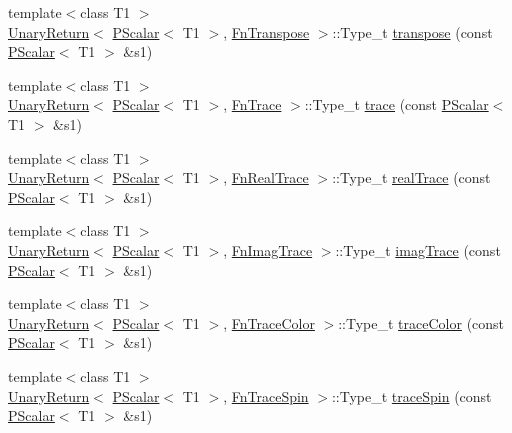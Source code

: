 \begin{DoxyCompactItemize}
\item 
{\footnotesize template$<$class T1 $>$ }\\\mbox{\hyperlink{structENSEM_1_1UnaryReturn}{Unary\+Return}}$<$ \mbox{\hyperlink{classENSEM_1_1PScalar}{P\+Scalar}}$<$ T1 $>$, \mbox{\hyperlink{structENSEM_1_1FnTranspose}{Fn\+Transpose}} $>$\+::Type\+\_\+t \mbox{\hyperlink{group__primscalar_gafa9e84efffc0a6f10d97120033276f1c}{transpose}} (const \mbox{\hyperlink{classENSEM_1_1PScalar}{P\+Scalar}}$<$ T1 $>$ \&s1)
\item 
{\footnotesize template$<$class T1 $>$ }\\\mbox{\hyperlink{structENSEM_1_1UnaryReturn}{Unary\+Return}}$<$ \mbox{\hyperlink{classENSEM_1_1PScalar}{P\+Scalar}}$<$ T1 $>$, \mbox{\hyperlink{structENSEM_1_1FnTrace}{Fn\+Trace}} $>$\+::Type\+\_\+t \mbox{\hyperlink{group__primscalar_ga13a07d573bfefc0db7496d278c078a52}{trace}} (const \mbox{\hyperlink{classENSEM_1_1PScalar}{P\+Scalar}}$<$ T1 $>$ \&s1)
\item 
{\footnotesize template$<$class T1 $>$ }\\\mbox{\hyperlink{structENSEM_1_1UnaryReturn}{Unary\+Return}}$<$ \mbox{\hyperlink{classENSEM_1_1PScalar}{P\+Scalar}}$<$ T1 $>$, \mbox{\hyperlink{structENSEM_1_1FnRealTrace}{Fn\+Real\+Trace}} $>$\+::Type\+\_\+t \mbox{\hyperlink{group__primscalar_ga63efc63157b5fc9495798f0391c8e170}{real\+Trace}} (const \mbox{\hyperlink{classENSEM_1_1PScalar}{P\+Scalar}}$<$ T1 $>$ \&s1)
\item 
{\footnotesize template$<$class T1 $>$ }\\\mbox{\hyperlink{structENSEM_1_1UnaryReturn}{Unary\+Return}}$<$ \mbox{\hyperlink{classENSEM_1_1PScalar}{P\+Scalar}}$<$ T1 $>$, \mbox{\hyperlink{structENSEM_1_1FnImagTrace}{Fn\+Imag\+Trace}} $>$\+::Type\+\_\+t \mbox{\hyperlink{group__primscalar_gaf760659a12c2bd7668440d8b83333086}{imag\+Trace}} (const \mbox{\hyperlink{classENSEM_1_1PScalar}{P\+Scalar}}$<$ T1 $>$ \&s1)
\item 
{\footnotesize template$<$class T1 $>$ }\\\mbox{\hyperlink{structENSEM_1_1UnaryReturn}{Unary\+Return}}$<$ \mbox{\hyperlink{classENSEM_1_1PScalar}{P\+Scalar}}$<$ T1 $>$, \mbox{\hyperlink{structENSEM_1_1FnTraceColor}{Fn\+Trace\+Color}} $>$\+::Type\+\_\+t \mbox{\hyperlink{group__primscalar_gaf9f8817942b8ea7583ac7146ede1508f}{trace\+Color}} (const \mbox{\hyperlink{classENSEM_1_1PScalar}{P\+Scalar}}$<$ T1 $>$ \&s1)
\item 
{\footnotesize template$<$class T1 $>$ }\\\mbox{\hyperlink{structENSEM_1_1UnaryReturn}{Unary\+Return}}$<$ \mbox{\hyperlink{classENSEM_1_1PScalar}{P\+Scalar}}$<$ T1 $>$, \mbox{\hyperlink{structENSEM_1_1FnTraceSpin}{Fn\+Trace\+Spin}} $>$\+::Type\+\_\+t \mbox{\hyperlink{group__primscalar_gacb9de2d99f632eb0d424014a2afbdef7}{trace\+Spin}} (const \mbox{\hyperlink{classENSEM_1_1PScalar}{P\+Scalar}}$<$ T1 $>$ \&s1)

\end{DoxyCompactItemize}
